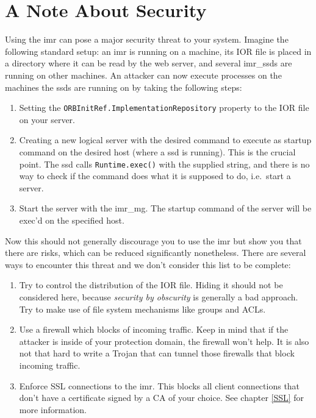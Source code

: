 \documentclass[12pt]{scrbook}
\begin{document}
\section{A Note About Security}
Using the imr can pose a major security threat to your system. Imagine
the following standard setup: an imr  is running on a machine, its IOR
file is placed in a directory where  it can be read by the web server,
and several  imr\_ssds are running  on other machines. An  attacker can
now  execute processes  on the  machines the  ssds are  running  on by
taking the following steps:
\begin{enumerate}
         \item  Setting the  {\tt ORBInitRef.ImplementationRepository}
                property to the IOR file on your server.
         \item  Creating a new logical server with the desired command
           to execute as startup command on the desired host (where a
           ssd is running). This is the crucial point. The ssd calls
           {\tt Runtime.exec()} with the supplied string, and there
           is no way to check if the command does what it is supposed
           to do, i.e.~start a server.
         \item Start the server with the imr\_mg. The startup command
           of the server will be exec'd on the specified host.
\end{enumerate}

Now this should  not generally discourage you to use  the imr but show
you  that   there  are  risks,  which  can   be  reduced  significantly
nonetheless. There  are several ways  to encounter this threat  and we
don't consider this list to be complete:
\begin{enumerate}
        \item Try to control the distribution of the IOR file. Hiding
          it should not be considered here, because {\it security by
            obscurity} is generally a bad approach. Try to make use of
          file system mechanisms like groups and ACLs.
          \item Use a firewall which blocks of incoming traffic. Keep
            in mind that if the attacker is inside of your protection
            domain, the firewall won't help. It is also not that hard
            to write a Trojan that can tunnel those firewalls that
            block incoming traffic.
          \item Enforce SSL connections to the imr. This blocks all
            client connections that don't have a certificate signed by
            a CA of your choice. See chapter \ref{SSL} for more
            information.
\end{enumerate}
\end{document}
